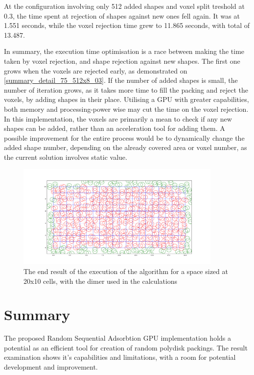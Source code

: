 \documentclass[12pt, oneside]{report}
\begin{document}
At the configuration involving only 512 added shapes and voxel split treshold at 0.3, the time spent at rejection of shapes against new ones fell again. It was at 1.551 seconds, while the voxel rejection time grew to 11.865 seconds, with total of 13.487. \newline

In summary, the execution time optimisation is a race between making the time taken by voxel rejection, and shape rejection against new shapes. The first one grows when the voxels are rejected early, as demonstrated on \ref{summary_detail_75_512x8_03}. If the number of added shapes is small, the number of iteration grows, as it takes more time to fill the packing and reject the voxels, by adding shapes in their place. Utilising a GPU with greater capabilities, both memory and processing-power wise may cut the time on the voxel rejection. \newline
In this implementation, the voxels are primarily a mean to check if any new shapes can be added, rather than an acceleration tool for adding them. A possible improvement for the entire process would be to dynamically change the added shape number, depending on the already covered area or voxel number, as the current solution involves static value.

\begin{figure}[H]
  \centering
	\label{summary_dimer_ready}
	\includegraphics[width=0.9\textwidth,keepaspectratio]{Images/SummaryOptimisation/dimer_ready.pdf}
	\caption{The end result of the execution of the algorithm for a space sized at 20x10 cells, with the dimer used in the calculations}
\end{figure}

\section{Summary}

The proposed Random Sequential Adsorbtion GPU implementation holds a potential as an efficient tool for creation of random polydisk packings. The result examination shows it's capabilities and limitations, with a room for potential development and improvement.


\newpage
\printbibliography
\end{document}
